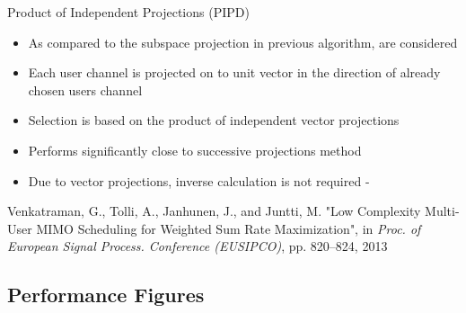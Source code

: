 \documentclass[11pt]{beamer}
\begin{document}
\begin{frame}{Product of Independent Projections (PIPD)\eqn{^\dagger}}
	\begin{itemize}
	\item As compared to the subspace projection in previous algorithm,  are considered
	\item Each user channel is projected on to unit vector in the direction of already chosen users channel
	\item Selection is based on the product of independent vector projections
	\item Performs significantly close to successive projections method
	\item Due to vector projections, inverse calculation is not required - 
	\end{itemize}
\eqn{^\dagger}\scriptsize{Venkatraman, G., Tolli, A., Janhunen, J., and Juntti, M. "Low Complexity Multi-User MIMO Scheduling for Weighted Sum Rate Maximization", in \emph{Proc. of European Signal Process. Conference (EUSIPCO)}, pp. 820--824, 2013}
\end{frame}

\subsection{Performance Figures}
\end{document}
